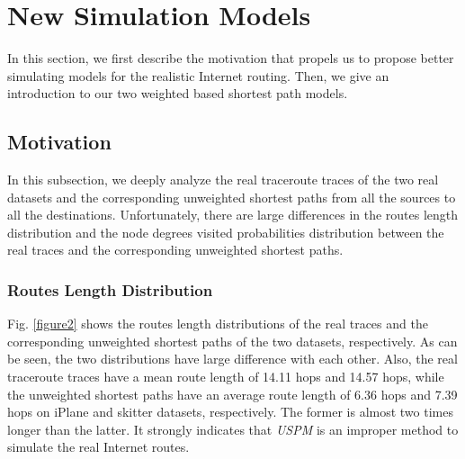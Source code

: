 \documentclass[a4paper]{llncs}
\begin{document}
\begin{comment}
Besides, Fig. \ref{figure1} shows the  of  of the two datasets, respectively.
From Table \ref{Properties of iPlane and skitter},and Fig. \ref{figure1}, we can easily find that these two are both scale-free networks. We could also learn from Table \ref{Properties of iPlane and
skitter} that the two datasets are different from each
other on {\it average degree}, {\it density}, {\it clustering
coefficient}, and {\it heterogeneity}. However, the other three
features are somewhat related to {\it average degree}. Thus,
we assume that it may be the {\it average degree} that makes the two network
datasets distinguishing.
\end{comment}

\section{New Simulation Models}
\label{sec:models}

In this section, we first describe the motivation that propels us to propose better simulating models for the realistic Internet routing. Then, we give an introduction to our two weighted based shortest path models. 
\subsection{Motivation}
\label{subsec:motivation}
In this subsection, we deeply analyze the real traceroute traces of the two real datasets and the corresponding unweighted shortest paths from all the sources to all the destinations. Unfortunately, there are large differences in the routes length distribution and the node degrees visited probabilities distribution between the real traces and the corresponding unweighted shortest paths.

\subsubsection{Routes Length Distribution}
Fig. \ref{figure2} shows the routes length distributions of the real traces and the corresponding unweighted shortest paths of the two datasets, respectively. As can be seen, the two distributions have large difference with each other. Also, the real traceroute traces have a mean route length of 14.11 hops and 14.57 hops, while the unweighted shortest paths have an average route length of 6.36 hops and 7.39 hops on iPlane and skitter datasets, respectively. The former is almost two times longer than the latter. It strongly indicates that \textit{USPM} is an improper method to simulate the real Internet routes.
\end{document}
